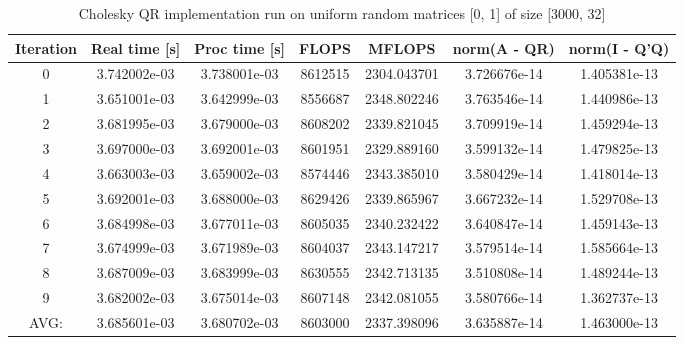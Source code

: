 \documentclass[11pt]{article}
\begin{document}
\begin{table}
  \centering

  \caption{Cholesky QR implementation run on uniform random matrices [0, 1] of size [3000, 32]}
  \vspace{3mm}

  \label{tab:chol_qr_3000}

  \begin{tabular}{c c c c c c c}
    Iteration & Real time [s] & Proc time [s] & FLOPS & MFLOPS & norm(A - QR) & norm(I - Q'Q) \\ \hline
    0 & 3.742002e-03 & 3.738001e-03 & 8612515 & 2304.043701 & 3.726676e-14 & 1.405381e-13 \\
    1 & 3.651001e-03 & 3.642999e-03 & 8556687 & 2348.802246 & 3.763546e-14 & 1.440986e-13 \\
    2 & 3.681995e-03 & 3.679000e-03 & 8608202 & 2339.821045 & 3.709919e-14 & 1.459294e-13 \\
    3 & 3.697000e-03 & 3.692001e-03 & 8601951 & 2329.889160 & 3.599132e-14 & 1.479825e-13 \\
    4 & 3.663003e-03 & 3.659002e-03 & 8574446 & 2343.385010 & 3.580429e-14 & 1.418014e-13 \\
    5 & 3.692001e-03 & 3.688000e-03 & 8629426 & 2339.865967 & 3.667232e-14 & 1.529708e-13 \\
    6 & 3.684998e-03 & 3.677011e-03 & 8605035 & 2340.232422 & 3.640847e-14 & 1.459143e-13 \\
    7 & 3.674999e-03 & 3.671989e-03 & 8604037 & 2343.147217 & 3.579514e-14 & 1.585664e-13 \\
    8 & 3.687009e-03 & 3.683999e-03 & 8630555 & 2342.713135 & 3.510808e-14 & 1.489244e-13 \\
    9 & 3.682002e-03 & 3.675014e-03 & 8607148 & 2342.081055 & 3.580766e-14 & 1.362737e-13 \\ \hline
    AVG: & 3.685601e-03 & 3.680702e-03 & 8603000 & 2337.398096 & 3.635887e-14 & 1.463000e-13 
  \end{tabular}
\end{table}
\end{document}
